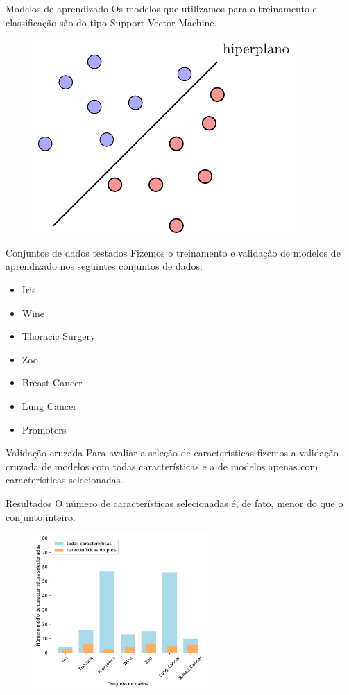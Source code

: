 \documentclass{beamer}
\begin{document}
\begin{frame}{Modelos de aprendizado}
    Os modelos que utilizamos para o treinamento e classificação
    são do tipo Support Vector Machine.
    \begin{figure}
        \centering
        \includegraphics[clip=true, width=.5\textwidth]{svm/svm.pdf}
    \end{figure}
\end{frame}

\begin{frame}{Conjuntos de dados testados}
Fizemos o treinamento e validação de modelos de aprendizado nos 
seguintes conjuntos de dados: \pause
    \begin{itemize}
        \item{Iris} \pause
        \item{Wine} \pause
        \item{Thoracic Surgery} \pause
        \item{Zoo} \pause
        \item{Breast Cancer} \pause
        \item{Lung Cancer} \pause
        \item{Promoters} \pause
    \end{itemize}
\end{frame}


\begin{frame}{Validação cruzada}
Para avaliar a seleção de características fizemos a validação cruzada
de modelos com todas características e a de modelos apenas com 
características selecionadas.
\end{frame}

\begin{frame}{Resultados}
    O número de características selecionadas é, de fato, menor do que
    o conjunto inteiro.\pause
    \begin{figure}
        \includegraphics[clip=true, width=0.6\textwidth]{uci/avg_features.pdf}
    \end{figure}
\end{frame}
\end{document}
